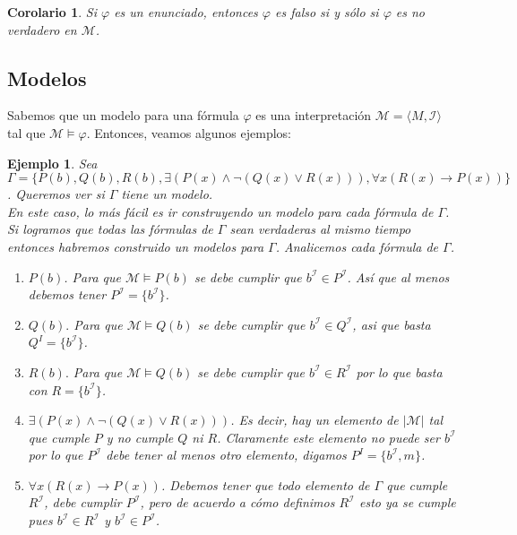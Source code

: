 \documentclass[letterpaper,12pt]{article}
\newtheorem{ejem}{Ejemplo}[]
\newtheorem{cor}{Corolario}[]
\begin{document}
    \begin{cor}
      Si $\varphi$ es un enunciado, entonces $\varphi$ es falso si y sólo si 
      $\varphi$ es no verdadero en $\mathcal{M}$.
    \end{cor}

    \subsection{Modelos}
    Sabemos que un modelo para una fórmula $\varphi$ es una interpretación 
    $\mathcal{M} = \langle M, \mathcal{I} \rangle$ tal que 
    $\mathcal{M} \models \varphi$. Entonces, veamos algunos ejemplos:
    \begin{ejem}
      Sea $\Gamma = \{ P(b), Q(b), R(b), \exists(P(x) \land 
      \neg (Q(x) \lor R(x))), \forall x (R(x) \rightarrow P(x))\}$. Queremos 
      ver si $\Gamma$ tiene un modelo. \\
      En este caso, lo más fácil es ir construyendo un modelo para cada 
      fórmula de $\Gamma$. Si logramos que todas las fórmulas de $\Gamma$ sean 
      verdaderas al mismo tiempo entonces habremos construido un modelos para 
      $\Gamma$. Analicemos cada fórmula de $\Gamma$.
      \begin{enumerate}
        \item $P(b)$. Para que $\mathcal{M} \models P(b)$ se debe cumplir que 
        $b^{\mathcal{I}} \in P^{\mathcal{I}}$. Así que al menos debemos tener 
        $P^{\mathcal{I}} = \{b^{\mathcal{I}}\}$.
        
        \item $Q(b).$ Para que $\mathcal{M} \models Q(b)$ se debe cumplir que
        $b^{\mathcal{I}} \in Q^{\mathcal{I}}$, asi que basta $Q^{I} = 
        \{b^{\mathcal{I}}\}$.

        \item $R(b).$ Para que $\mathcal{M} \models Q(b)$ se debe cumplir que 
        $b^{\mathcal{I}} \in R^{\mathcal{I}}$ por lo que basta con $R = 
        \{b^{\mathcal{I}}\}$.

        \item $\exists(P(x) \land \neg (Q(x) \lor R(x)))$. Es decir, hay un 
        elemento de $|\mathcal{M}|$ tal que cumple $P$ y no cumple $Q$ ni $R$.
        Claramente este elemento no puede ser $b^{\mathcal{I}}$ por lo que 
        $P^{\mathcal{I}}$ debe tener al menos otro elemento, digamos 
        $P^{I} = \{b^{\mathcal{I}}, m\}$.

        \item $\forall x(R(x) \rightarrow P(x))$. Debemos tener que todo 
        elemento de $\Gamma$ que cumple $R^{\mathcal{I}}$, debe cumplir 
        $P^{\mathcal{I}}$, pero de acuerdo a cómo definimos 
        $R^{\mathcal{I}}$ esto ya se cumple pues $b^{\mathcal{I}} \in
        R^{\mathcal{I}}$ y $b^{\mathcal{I}} \in P^{\mathcal{I}}$. 
      \end{enumerate}


\end{ejem}
\end{document}

